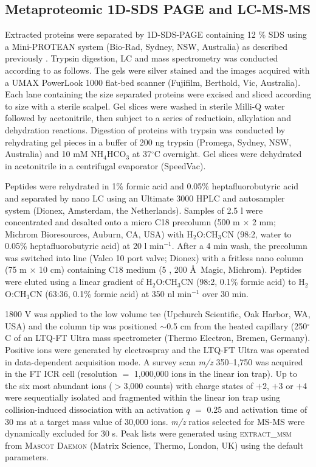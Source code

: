 \subsection{Metaproteomic \acs{1D-SDS PAGE} and \acs{LC}-\acs{MS-MS}}
Extracted proteins were separated by \ac{1D-SDS-PAGE} containing 12 \% SDS using a Mini-PROTEAN system (Bio-Rad, Sydney, NSW, Australia) as described previously \cite{Saunders2006}.
Trypsin digestion, \ac{LC} and mass spectrometry was conducted according to \citet{Ng2010a} as follows.
The gels were silver stained and the images acquired with a UMAX PowerLook 1000 flat-bed scanner (Fujifilm, Berthold, Vic, Australia).
Each lane containing the size separated proteins were excised and sliced according to size with a sterile scalpel.
Gel slices were washed in sterile Milli-Q water followed by acetonitrile, then subject to a series of reductioin, alkylation and dehydration reactions.
Digestion of proteins with trypsin was conducted by rehydrating gel pieces in a buffer of 200 ng trypsin (Promega, Sydney, NSW, Australia) and 10 mM NH$_4$HCO$_3$ at 37$^{\circ}$C overnight. 
Gel slices were dehydrated in acetonitrile in a centrifugal evaporator (SpeedVac).

Peptides were rehydrated in 1\% formic acid and 0.05\% heptafluorobutyric acid and separated by nano \ac{LC} using an Ultimate 3000 \acs{HPLC} and autosampler system (Dionex, Amsterdam, the Netherlands).
Samples of 2.5 \textmu{}l were concentrated and desalted onto a micro C18 precolumn (500 \textmu{}m $\times$ 2 mm; Michrom Bioresources, Auburn, \textsc{CA}, \textsc{USA}) with H$_2$O:CH$_3$CN (98:2, water to 0.05\% heptafluorobutyric acid) at 20 \textmu{}l min$^{-1}$.
After a 4 min wash, the precolumn was switched into line (Valco 10 port valve; Dionex) with a fritless nano column (75 \textmu{}m $\times$ 10 cm) containing C18 medium (5 \textmu{}, 200 \AA\ Magic, Michrom).
Peptides were eluted using a linear gradient of H$_2$O:CH$_3$CN (98:2, 0.1\% formic acid) to H$_2$O:CH$_3$CN (63:36, 0.1\% formic acid) at 350 nl min$^{-1}$ over 30 min.

1800 V was applied to the low volume tee (Upchurch Scientific, Oak Harbor, \textsc{WA}, \textsc{USA}) and the column tip was positioned $\sim$0.5 cm from the heated capillary (250$^{\circ}$C of an LTQ-FT Ultra mass spectrometer (Thermo Electron, Bremen, Germany).
Positive ions were generated by electrospray and the LTQ-FT Ultra was operated in data-dependent acquisition mode.
A survey scan \emph{m/z} 350--1,750 was acquired in the FT ICR cell (resolution $=$ 1,000,000 ions in the linear ion trap).
Up to the six most abundant ions ($>$3,000 counts) with charge states of $+$2, $+$3 or $+$4 were sequentially isolated and fragmented within the linear ion trap using collision-induced dissociation with an activation $q$ $=$ 0.25 and activation time of 30 ms at a target mass value of 30,000 ions.
\emph{m/z} ratios selected for \ac{MS-MS} were dynamically excluded for 30 s.
Peak lists were generated using \textsc{extract\_msm} from \textsc{Mascot Daemon} (Matrix Science, Thermo, London, \textsc{UK}) using the default parameters.

